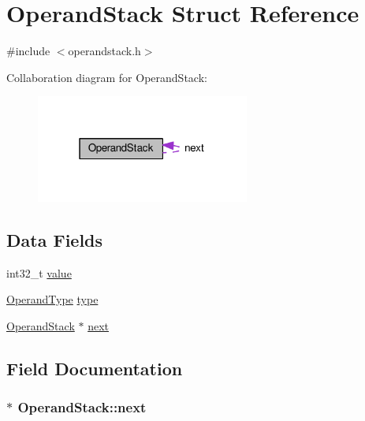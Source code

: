 \hypertarget{structOperandStack}{}\section{Operand\+Stack Struct Reference}
\label{structOperandStack}


{\ttfamily \#include $<$operandstack.\+h$>$}



Collaboration diagram for Operand\+Stack\+:\nopagebreak
\begin{figure}[H]
\begin{center}
\leavevmode
\includegraphics[width=199pt]{structOperandStack__coll__graph}
\end{center}
\end{figure}
\subsection*{Data Fields}
\begin{DoxyCompactItemize}
\item 
int32\+\_\+t \hyperlink{structOperandStack_a931d181370bfdb5b41edb8fe488c3b90}{value}
\item 
\hyperlink{operandstack_8h_aa4b9b8291a90b1a586c468110fb346a4}{Operand\+Type} \hyperlink{structOperandStack_ad7a4540e55819de1b5cebd7fd037764a}{type}
\item 
\hyperlink{structOperandStack}{Operand\+Stack} $\ast$ \hyperlink{structOperandStack_a50f11851dd7d245d2bbc7bedb0402856}{next}
\end{DoxyCompactItemize}


\subsection{Field Documentation}
\subsubsection[{\texorpdfstring{next}{next}}]{$\ast$ Operand\+Stack\+::next}\hypertarget{structOperandStack_a50f11851dd7d245d2bbc7bedb0402856}{}\label{structOperandStack_a50f11851dd7d245d2bbc7bedb0402856}

